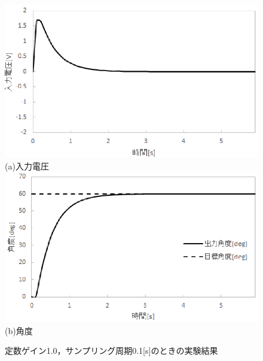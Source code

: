 \documentclass[11pt,a4paper]{jsarticle}
\begin{document}
\begin{figure}[H]
 \begin{center}
  \includegraphics[scale=.6]{./picture/regraph3.eps} \\
  (a)入力電圧 \\
  \includegraphics[scale=.6]{./picture/regraph4.eps} \\
  (b)角度
  \caption{定数ゲイン1.0，サンプリング周期0.1[s]のときの実験結果}
 \end{center}
\end{figure}
\end{document}
